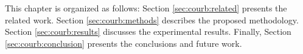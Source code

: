 This chapter is organized as follows: Section \ref{sec:courb:related} presents the related work. Section \ref{sec:courb:methods} describes the proposed methodology. Section \ref{sec:courb:results} discusses the experimental results. Finally, Section \ref{sec:courb:conclusion} presents the conclusions and future work.
